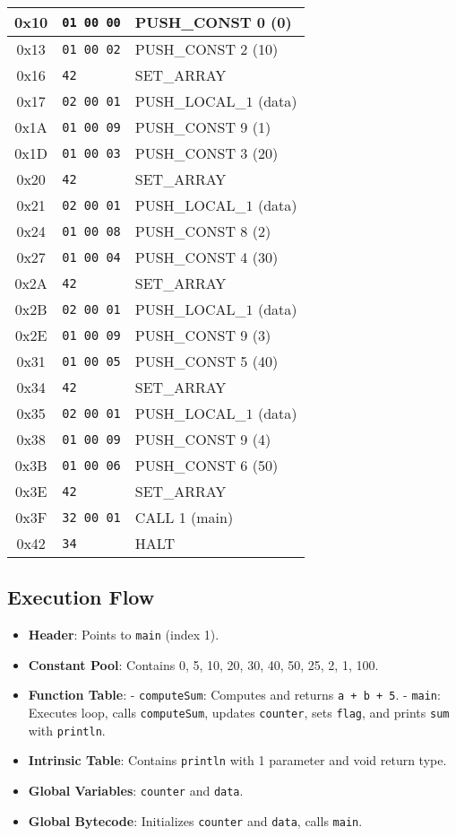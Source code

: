 \documentclass[a4paper,12pt]{article}
\begin{document}
\begin{longtable}{|c|l|p{6cm}|}
  0x10 & \texttt{01 00 00} & PUSH\_CONST 0 (0) \\ \hline
  0x13 & \texttt{01 00 02} & PUSH\_CONST 2 (10) \\ \hline
  0x16 & \texttt{42} & SET\_ARRAY \\ \hline
  0x17 & \texttt{02 00 01} & PUSH\_LOCAL\_$1$ (data) \\ \hline
  0x1A & \texttt{01 00 09} & PUSH\_CONST 9 (1) \\ \hline
  0x1D & \texttt{01 00 03} & PUSH\_CONST 3 (20) \\ \hline
  0x20 & \texttt{42} & SET\_ARRAY \\ \hline
  0x21 & \texttt{02 00 01} & PUSH\_LOCAL\_$1$ (data) \\ \hline
  0x24 & \texttt{01 00 08} & PUSH\_CONST 8 (2) \\ \hline
  0x27 & \texttt{01 00 04} & PUSH\_CONST 4 (30) \\ \hline
  0x2A & \texttt{42} & SET\_ARRAY \\ \hline
  0x2B & \texttt{02 00 01} & PUSH\_LOCAL\_$1$ (data) \\ \hline
  0x2E & \texttt{01 00 09} & PUSH\_CONST 9 (3) \\ \hline
  0x31 & \texttt{01 00 05} & PUSH\_CONST 5 (40) \\ \hline
  0x34 & \texttt{42} & SET\_ARRAY \\ \hline
  0x35 & \texttt{02 00 01} & PUSH\_LOCAL\_$1$ (data) \\ \hline
  0x38 & \texttt{01 00 09} & PUSH\_CONST 9 (4) \\ \hline
  0x3B & \texttt{01 00 06} & PUSH\_CONST 6 (50) \\ \hline
  0x3E & \texttt{42} & SET\_ARRAY \\ \hline
  0x3F & \texttt{32 00 01} & CALL 1 (main) \\ \hline
  0x42 & \texttt{34} & HALT \\ \hline
\end{longtable}

\subsection{Execution Flow}
\begin{itemize}
\item \textbf{Header}: Points to \texttt{main} (index 1).
\item \textbf{Constant Pool}: Contains 0, 5, 10, 20, 30, 40, 50, 25, 2, 1, 100.
\item \textbf{Function Table}:
  - \texttt{computeSum}: Computes and returns \texttt{a + b + 5}.
  - \texttt{main}: Executes loop, calls \texttt{computeSum}, updates \texttt{counter}, sets \texttt{flag}, and prints \texttt{sum} with \texttt{println}.
\item \textbf{Intrinsic Table}: Contains \texttt{println} with 1 parameter and void return type.
\item \textbf{Global Variables}: \texttt{counter} and \texttt{data}.
\item \textbf{Global Bytecode}: Initializes \texttt{counter} and \texttt{data}, calls \texttt{main}.
\end{itemize}
\end{document}
